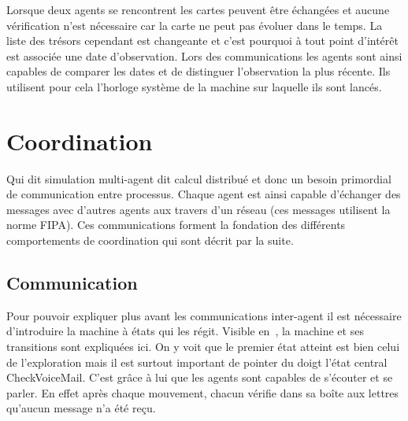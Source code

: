 \documentclass[11pt]{article}
\begin{document}
Lorsque deux agents se rencontrent les cartes peuvent être échangées et aucune vérification n'est nécessaire car la carte ne peut pas évoluer dans le temps. La liste des trésors cependant est changeante et c'est pourquoi à tout point d'intérêt est associée une date d'observation. Lors des communications les agents sont ainsi capables de comparer les dates et de distinguer l'observation la plus récente. Ils utilisent pour cela l'horloge système de la machine sur laquelle ils sont lancés.
\section{Coordination}

Qui dit simulation multi-agent dit calcul distribué et donc un besoin primordial de communication entre processus. Chaque agent est ainsi capable d'échanger des messages avec d'autres agents aux travers d'un réseau (ces messages utilisent la norme FIPA). Ces communications forment la fondation des différents comportements de coordination qui sont décrit par la suite.

\subsection{Communication}
\label{sec-comm}

Pour pouvoir expliquer plus avant les communications inter-agent il est nécessaire d'introduire la machine à états qui les régit. Visible en~, la machine et ses transitions sont expliquées ici. On y voit que le premier état atteint est bien celui de l'exploration mais il est surtout important de pointer du doigt l'état central \textsf{CheckVoiceMail}. C'est grâce à lui que les agents sont capables de s'écouter et se parler. En effet après chaque mouvement, chacun vérifie dans sa boîte aux lettres qu'aucun message n'a été reçu.
\end{document}
